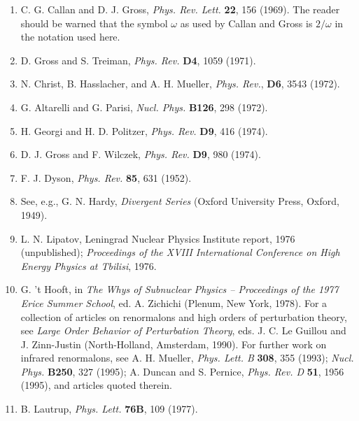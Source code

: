 \begin{enumerate}
\item {}\label{ch20-ref-12}
C. G. Callan and D. J. Gross, \emph{Phys. Rev. Lett.} \textbf{22}, 156 (1969). The reader should be warned that the symbol $\omega$ as used by Callan and Gross is $2/\omega$ in the notation used here.

\item {}\label{ch20-ref-13}
D. Gross and S. Treiman, \emph{Phys. Rev.} \textbf{D4}, 1059 (1971).

\item {}\label{ch20-ref-14}
N. Christ, B. Hasslacher, and A. H. Mueller, \emph{Phys. Rev.}, \textbf{D6}, 3543 (1972).

\item {}\label{ch20-ref-15}
G. Altarelli and G. Parisi, \emph{Nucl. Phys.} \textbf{B126}, 298 (1972).

\item {}\label{ch20-ref-16}
H. Georgi and H. D. Politzer, \emph{Phys. Rev.} \textbf{D9}, 416 (1974).

\item {}\label{ch20-ref-17}
D. J. Gross and F. Wilczek, \emph{Phys. Rev.} \textbf{D9}, 980 (1974).

\item {}\label{ch20-ref-18}
F. J. Dyson, \emph{Phys. Rev.} \textbf{85}, 631 (1952).

\item {}\label{ch20-ref-19}
See, e.g., G. N. Hardy, \emph{Divergent Series} (Oxford University Press, Oxford, 1949).

\item {}\label{ch20-ref-20}
L. N. Lipatov, Leningrad Nuclear Physics Institute report, 1976 (unpublished); \emph{Proceedings of the XVIII International Conference on High Energy Physics at Tbilisi}, 1976.

\item {}\label{ch20-ref-21}
G. 't Hooft, in \emph{The Whys of Subnuclear Physics -- Proceedings of the 1977 Erice Summer School}, ed. A. Zichichi (Plenum, New York, 1978). For a collection of articles on renormalons and high orders of perturbation theory, see \emph{Large Order Behavior of Perturbation Theory}, eds. J. C. Le Guillou and J. Zinn-Justin (North-Holland, Amsterdam, 1990). For further work on infrared renormalons, see A. H. Mueller, \emph{Phys. Lett. B} \textbf{308}, 355 (1993); \emph{Nucl. Phys.} \textbf{B250}, 327 (1995); A. Duncan and S. Pernice, \emph{Phys. Rev. D} \textbf{51}, 1956 (1995), and articles quoted therein.

\item {}\label{ch20-ref-22}
B. Lautrup, \emph{Phys. Lett.} \textbf{76B}, 109 (1977).
\end{enumerate}
